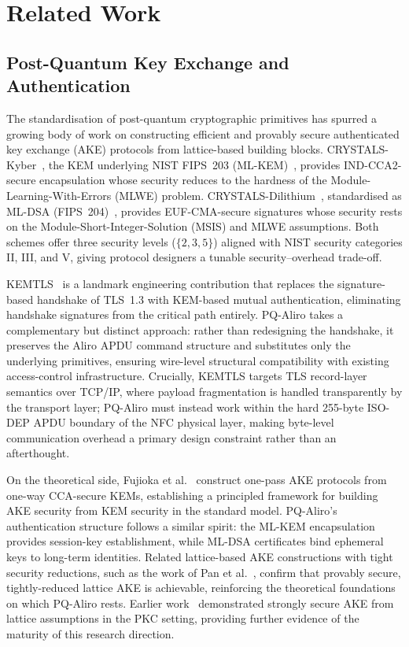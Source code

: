 \section{Related Work}
\label{sec:related}

\subsection{Post-Quantum Key Exchange and Authentication}
\label{sec:related:pqake}

The standardisation of post-quantum cryptographic primitives has spurred a
growing body of work on constructing efficient and provably secure authenticated
key exchange (AKE) protocols from lattice-based building blocks.
CRYSTALS-Kyber~\cite{EuroSP:BDKLLSSSS18}, the KEM underlying NIST FIPS~203
(ML-KEM)~\cite{NIST:FIPS203}, provides IND-CCA2-secure encapsulation whose
security reduces to the hardness of the Module-Learning-With-Errors (MLWE)
problem.
CRYSTALS-Dilithium~\cite{TCHES:DKLLSSS18}, standardised as ML-DSA (FIPS~204)~\cite{NIST:FIPS204},
provides EUF-CMA-secure signatures whose security rests on the Module-Short-Integer-Solution
(MSIS) and MLWE assumptions.
Both schemes offer three security levels ($\{2, 3, 5\}$) aligned with NIST
security categories II, III, and V, giving protocol designers a tunable
security--overhead trade-off.

KEMTLS~\cite{CCS:SchSteWig20} is a landmark engineering contribution that
replaces the signature-based handshake of TLS~1.3 with KEM-based mutual
authentication, eliminating handshake signatures from the critical path entirely.
PQ-Aliro takes a complementary but distinct approach: rather than redesigning
the handshake, it preserves the Aliro APDU command structure and substitutes
only the underlying primitives, ensuring wire-level structural compatibility
with existing access-control infrastructure.
Crucially, KEMTLS targets TLS record-layer semantics over TCP/IP, where
payload fragmentation is handled transparently by the transport layer; PQ-Aliro
must instead work within the hard 255-byte ISO-DEP APDU boundary of the NFC
physical layer, making byte-level communication overhead a primary design
constraint rather than an afterthought.

On the theoretical side, Fujioka et al.~\cite{ASIACCS:FSXY13} construct
one-pass AKE protocols from one-way CCA-secure KEMs, establishing a principled
framework for building AKE security from KEM security in the standard model.
PQ-Aliro's authentication structure follows a similar spirit: the ML-KEM
encapsulation provides session-key establishment, while ML-DSA certificates
bind ephemeral keys to long-term identities.
Related lattice-based AKE constructions with tight security reductions, such as
the work of Pan et al.~\cite{C:PanWagZen23}, confirm that provably secure,
tightly-reduced lattice AKE is achievable, reinforcing the theoretical
foundations on which PQ-Aliro rests.
Earlier work~\cite{PKC:FSXY12} demonstrated strongly secure AKE from lattice
assumptions in the PKC setting, providing further evidence of the maturity of
this research direction.

